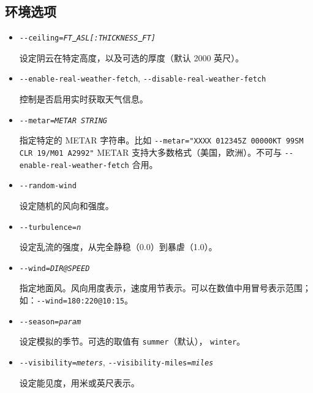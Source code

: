 \ifchinese
{
  \subsection{环境选项}
\begin{itemize}
\item{\texttt{-$ $-ceiling={\it FT\underline{~}ASL[:THICKNESS\underline{~}FT]}}}
 
   设定阴云在特定高度，以及可选的厚度（默认 2000 英尺）。

\item{\texttt{-$ $-enable-real-weather-fetch}, \texttt{-$ $-disable-real-weather-fetch}}

   控制是否启用实时获取天气信息。

\item{\texttt{-$ $-metar={\it METAR STRING}}}

  指定特定的 METAR 字符串。比如 \texttt{-$ $-metar="XXXX 012345Z 00000KT 99SM CLR 19/M01 A2992"} METAR 支持大多数格式（美国，欧洲）。不可与 \texttt{-$ $-enable-real-weather-fetch} 合用。

\item{\texttt{-$ $-random-wind}}

  设定随机的风向和强度。

\item{\texttt{-$ $-turbulence={\it n}}}

  设定乱流的强度，从完全静稳（0.0）到暴虐（1.0）。

\item{\texttt{-$ $-wind={\it DIR@SPEED}}}

  指定地面风。风向用度表示，速度用节表示。可以在数值中用冒号表示范围；如：\texttt{-$ $-wind=180:220@10:15}。

\item{\texttt{-$ $-season={\it param}}}

  设定模拟的季节。可选的取值有 \texttt{summer}（默认）， \texttt{winter}。

\item{\texttt{-$ $-visibility={\it meters}}, \texttt{-$ $-visibility-miles={\it miles}}}

  设定能见度，用米或英尺表示。

  \end{itemize}
}
\fi


